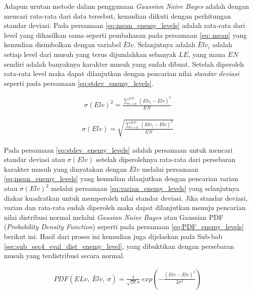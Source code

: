 Adapun urutan metode dalam penggunaan \textit{Gaussian Naive Bayes} adalah dengan mencari rata-rata dari data tersebut, kemudian diikuti dengan perhitungan standar deviasi. Pada persamaan \ref{eq:mean_enemy_levels} adalah rata-rata dari level yang dihasilkan sama seperti pembahasan pada persamaan \ref{eq: mean} yang kemudian disimbolkan dengan variabel $\bar{E}lv$. Selanjutnya adalah $\bar{E}lv_{i}$ adalah setiap level dari musuh yang terus dijumlahkan sebanyak $LE$, yang mana $EN$ sendiri adalah banyaknya karakter musuh yang sudah dibuat. Setelah diperoleh rata-rata level maka dapat dilanjutkan dengan pencarian nilai \textit{standar deviasi} seperti pada persamaan \ref{eq:stdev_enemy_levels}.
\vspace{1ex}

\begin{equation}\label{eq:varian_enemy_levels}
\begin{split}
\sigma(Elv)^2 = \frac{\sum_{i = 0}^{EN}\ (Elv_{i} - \bar{E}lv)^{2}}{EN}
\end{split}
\end{equation}

\begin{equation}\label{eq:stdev_enemy_levels}
\begin{split}
\sigma(Elv) = \sqrt{\frac{\sum_{i = 0}^{EN}\ (Elv_{i} - \bar{E}lv)^{2}}{EN}}
\end{split}
\end{equation}

Pada persamaan \ref{eq:stdev_enemy_levels} adalah persamaan untuk mencari standar deviasi atau $\sigma(Elv)$ setelah diperolehnya rata-rata dari persebaran karakter musuh yang dinyatakan dengan $\bar{E}lv$ melalui persamaan \ref{eq:mean_enemy_levels} yang kemudian dilanjutkan dengan pencarian varian atau $\sigma(Elv)^2$ melalui persamaan \ref{eq:varian_enemy_levels} yang selanjutnya diakar kuadratkan untuk memperoleh nilai standar deviasi. Jika standar deviasi, varian dan rata-rata sudah diperoleh maka dapat dilanjutkan menuju pencarian nilai distribusi normal melalui \textit{Gausian Naive Bayes} atau Gaussian PDF (\textit{Probability Density Function}) seperti pada persamaan \ref{eq:PDF_enemy_levels} berikut ini. Hasil dari proses ini kemudian juga dijelaskan pada Sub-bab \ref{sec:sub_sec4_eval_dist_enemy_level}, yang dibuktikan dengan persebaran musuh yang terdistribusi secara normal.
\vspace{1ex}

\begin{equation}\label{eq:PDF_enemy_levels}
\begin{split}
PDF(ELv,\ \bar{E}lv,\ \sigma) = \frac{1}{\sqrt{2 \pi} \sigma}\ exp \left(-\frac{(Elv - \bar{E}lv)^2}{2 \sigma^2}\right)
\end{split}
\end{equation}

